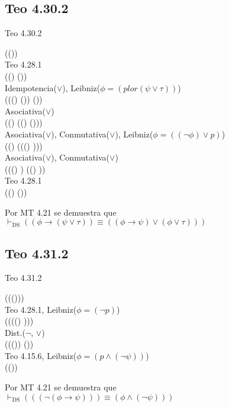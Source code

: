 \documentclass{article}
\begin{document}
\subsection{Teo 4.30.2}
\begin{logicenv}{Teo 4.30.2}
    \begin{derivation}
            (\phi \to (\psi \lor \tau))\\
        Teo 4.28.1\\
            ((\neg \phi) \lor (\psi \lor \tau))\\
        Idempotencia($\lor$), Leibniz($\phi = (p lor (\psi \lor \tau))$)\\
            (((\neg \phi) \lor (\neg \phi)) \lor (\psi \lor \tau))\\
        Asociativa($\lor$)\\
            ((\neg \phi) \lor ((\neg \phi) \lor (\psi \lor \tau)))\\
        Asociativa($\lor$), Conmutativa($\lor$), Leibniz($\phi = ((\neg \phi) \lor p)$)\\
            ((\neg \phi) \lor (\tau \lor ((\neg \phi) \lor \psi)))\\
        Asociativa($\lor$), Conmutativa($\lor$)\\
            (((\neg \phi) \lor \psi) \lor ((\neg \phi) \lor \tau))\\
        Teo 4.28.1\\
            ((\phi \to \psi) \lor (\phi \lor \tau))
    \end{derivation}
    Por MT 4.21 se demuestra que\\
    $\vdash_{\text{DS}} ((\phi \to (\psi \lor \tau)) \equiv ((\phi \to \psi) \lor (\phi \lor \tau)))$
\end{logicenv}

\subsection{Teo 4.31.2}
\begin{logicenv}{Teo 4.31.2}
    \begin{derivation}
            ((\neg (\phi \to \psi)))\\
        Teo 4.28.1, Leibniz($\phi = (\neg p)$)\\
            ((\neg ((\neg \phi) \lor \psi)))\\
        Dist.($\neg$, $\lor$)\\
            ((\neg (\neg \phi)) \land (\neg \psi))\\
        Teo 4.15.6, Leibniz($\phi = (p \land (\neg \psi))$)\\
            (\phi \land (\neg \psi))
    \end{derivation}
    Por MT 4.21 se demuestra que\\
    $\vdash_{\text{DS}} (((\neg (\phi \to \psi))) \equiv (\phi \land (\neg \psi)))$
\end{logicenv}
\end{document}
